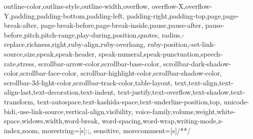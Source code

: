 {{    outline-color,outline-style,outline-width,overflow,
    overflow-X,overflow-Y,padding,padding-bottom,padding-left,
    padding-right,padding-top,page,page-break-after,
    page-break-before,page-break-inside,pause,pause-after,
    pause-before,pitch,pitch-range,play-during,position,quotes,
    radius,-replace,richness,right,ruby-align,ruby-overhang,
    ruby-position,-set-link-source,size,speak,speak-header,
    speak-numeral,speak-punctuation,speech-rate,stress,
    scrollbar-arrow-color,scrollbar-base-color,
    scrollbar-dark-shadow-color,scrollbar-face-color,
    scrollbar-highlight-color,scrollbar-shadow-color,
    scrollbar-3d-light-color,scrollbar-track-color,table-layout,
    text,text-align,text-align-last,text-decoration,text-indent,
    text-justify,text-overflow,text-shadow,text-transform,
    text-autospace,text-kashida-space,text-underline-position,top,
    unicode-bidi,-use-link-source,vertical-align,visibility,
    voice-family,volume,weight,white-space,widows,width,word-break,
    word-spacing,word-wrap,writing-mode,z-index,zoom},
  morestring=[s]{:}{;},
  sensitive,
  morecomment=[s]{/*}{*/}
}

\usepackage{avant} %
\usepackage{mathptmx} %

\usepackage{microtype} %
\usepackage[utf8]{inputenc} %
\usepackage[T1]{fontenc} %


\usepackage{csquotes}
\usepackage[style=numeric,citestyle=numeric,autocite=superscript,sorting=none,sortcites=false,autopunct=true,autolang=other,hyperref=true,abbreviate=false,backref=true,backend=biber]{biblatex}

\usepackage{calc} %
\usepackage{makeidx} %
\makeindex %

